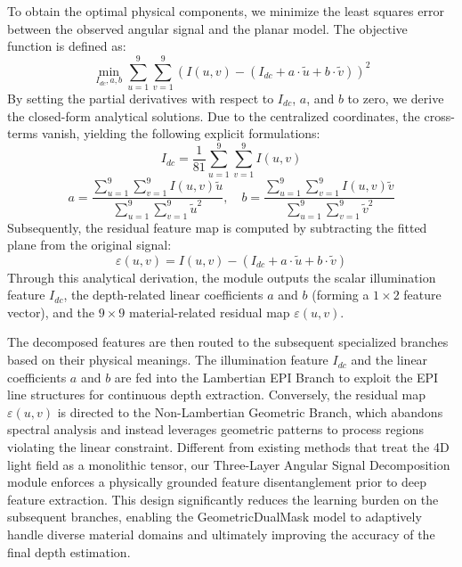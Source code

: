 \documentclass[lettersize,journal]{IEEEtran}
\begin{document}
To obtain the optimal physical components, we minimize the least squares error between the observed angular signal and the planar model. The objective function is defined as:
\begin{equation}
\min_{I_{dc}, a, b} \sum_{u=1}^{9} \sum_{v=1}^{9} \left( I(u,v) - (I_{dc} + a \cdot \tilde{u} + b \cdot \tilde{v}) \right)^2
\label{eq:ch3_4}
\end{equation}
By setting the partial derivatives with respect to $I_{dc}$, $a$, and $b$ to zero, we derive the closed-form analytical solutions. Due to the centralized coordinates, the cross-terms vanish, yielding the following explicit formulations:
\begin{equation}
I_{dc} = \frac{1}{81} \sum_{u=1}^{9} \sum_{v=1}^{9} I(u,v)
\label{eq:ch3_5}
\end{equation}
\begin{equation}
a = \frac{\sum_{u=1}^{9} \sum_{v=1}^{9} I(u,v) \tilde{u}}{\sum_{u=1}^{9} \sum_{v=1}^{9} \tilde{u}^2}, \quad b = \frac{\sum_{u=1}^{9} \sum_{v=1}^{9} I(u,v) \tilde{v}}{\sum_{u=1}^{9} \sum_{v=1}^{9} \tilde{v}^2}
\label{eq:ch3_6}
\end{equation}
Subsequently, the residual feature map is computed by subtracting the fitted plane from the original signal:
\begin{equation}
\varepsilon(u,v) = I(u,v) - (I_{dc} + a \cdot \tilde{u} + b \cdot \tilde{v})
\label{eq:ch3_7}
\end{equation}
Through this analytical derivation, the module outputs the scalar illumination feature $I_{dc}$, the depth-related linear coefficients $a$ and $b$ (forming a $1 \times 2$ feature vector), and the $9 \times 9$ material-related residual map $\varepsilon(u,v)$.

The decomposed features are then routed to the subsequent specialized branches based on their physical meanings. The illumination feature $I_{dc}$ and the linear coefficients $a$ and $b$ are fed into the Lambertian EPI Branch to exploit the EPI line structures for continuous depth extraction. Conversely, the residual map $\varepsilon(u,v)$ is directed to the Non-Lambertian Geometric Branch, which abandons spectral analysis and instead leverages geometric patterns to process regions violating the linear constraint. Different from existing methods that treat the 4D light field as a monolithic tensor, our Three-Layer Angular Signal Decomposition module enforces a physically grounded feature disentanglement prior to deep feature extraction. This design significantly reduces the learning burden on the subsequent branches, enabling the GeometricDualMask model to adaptively handle diverse material domains and ultimately improving the accuracy of the final depth estimation.
\end{document}
